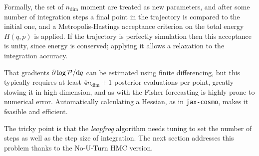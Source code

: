 \documentclass[twocolumn,twocolappendix,nofootinbib,iop]{openjournal}
\newcommand{\jaxcosmo}{\texttt{jax-cosmo}}
\begin{document}
Formally, the set of $n_\mathrm{dim}$ moment are treated as new parameters, and after 
some number of integration steps a final point in the trajectory is compared to the initial one,
and a Metropolis-Hastings acceptance criterion on the total energy $H(q,p)$ is applied. If the trajectory is perfectly simulation then this acceptance is unity, since energy is conserved; applying it allows
a relaxation to the integration accuracy.

That gradients $\partial \log{\cal P} / \mathrm{d} q$ can be estimated using finite differencing,
but this typically requires at least $4 n_{\mathrm{dim}} + 1$ posterior evaluations per point, greatly slowing it
in high dimension, and as with the Fisher forecasting is highly prone to numerical error. Automatically
calculating a Hessian, as in \jaxcosmo, makes it feasible and efficient.

The tricky point is that the \textit{leapfrog} algorithm needs tuning to set the number of steps as well as the step size of integration. The next section addresses this problem thanks to the No-U-Turn HMC version.
\end{document}
